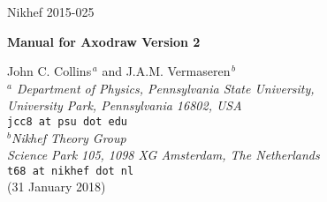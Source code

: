 \documentclass[12pt]{article}
\def\program#1{\texttt{#1}}
\begin{document}



\setcounter{page}{0}
\thispagestyle{empty}
\hfill \begin{minipage}{3.0cm}
Nikhef 2015-025
\end{minipage}
\vspace{20mm}

\begin{center}
{\LARGE\bf\sc Manual for Axodraw Version 2}
\end{center}
\vspace{5mm}
\begin{center}
{\large John C. Collins$^{\, a}$ and J.A.M. Vermaseren$^{\, b}$} 
\vspace{1cm}\\
{\it $^a$ Department of Physics, Pennsylvania State University, \\
\vspace{0.1cm}
University Park, Pennsylvania 16802, USA} \\
\texttt{jcc8 at psu dot edu} \\
\vspace{0.5cm}
{\it $^b$Nikhef Theory Group \\
\vspace{0.1cm}
Science Park 105, 1098 XG Amsterdam, The Netherlands} \\
\texttt{t68 at nikhef dot nl} \\
\vspace{1.0cm}
(31 January 2018)
\end{center}
\vspace{5mm}

\begin{abstract}
This is the reference manual for version two of the \LaTeX{} graphical
style file Axodraw.  
Relative to version one,
it has a number of new drawing primitives and many extra options, and 
it can now work with \program{pdflatex} to directly produce
output in PDF file format (but with the aid of an auxiliary program).
\end{abstract}
\end{document}
